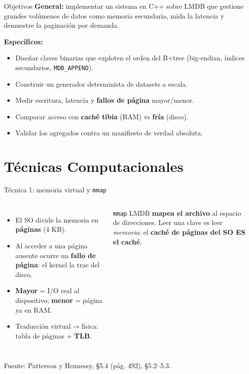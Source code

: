 \documentclass[aspectratio=169,11pt]{beamer}
\begin{document}
\begin{frame}{Objetivos}
  \textbf{General:} implementar un sistema en C++ sobre LMDB que gestione
  grandes volúmenes de datos como memoria secundaria, mida la latencia y
  demuestre la paginación por demanda.

  \vspace{0.3cm}
  \textbf{Específicos:}
  \begin{itemize}
    \item Diseñar claves binarias que exploten el orden del B+tree
      (big-endian, índices secundarios, \texttt{MDB\_APPEND}).
    \item Construir un generador determinista de datasets a escala.
    \item Medir escritura, latencia y \textbf{fallos de página} mayor/menor.
    \item Comparar acceso con \textbf{caché tibia} (RAM) vs \textbf{fría}
      (disco).
    \item Validar los agregados contra un manifiesto de verdad absoluta.
  \end{itemize}
\end{frame}

\section{Técnicas Computacionales}

\begin{frame}{Técnica 1: memoria virtual y \texttt{mmap}}
  \begin{columns}
      \begin{itemize}
        \item El SO divide la memoria en \textbf{páginas} (4 KB).
        \item Al acceder a una página ausente ocurre un \textbf{fallo de
          página}: el kernel la trae del disco.
        \item \textbf{Mayor} = I/O real al dispositivo; \textbf{menor} =
          página ya en RAM.
        \item Traducción virtual$\to$física: tabla de páginas + \textbf{TLB}.
      \end{itemize}
      \begin{block}{\texttt{mmap}}
        LMDB \textbf{mapea el archivo} al espacio de direcciones. Leer una
        clave es leer \emph{memoria}: el \textbf{caché de páginas del SO
        ES el caché}.
      \end{block}
  \end{columns}
  \vspace{0.2cm}
  \footnotesize Fuente: Patterson y Hennessy, \S5.4 (pág. 492), \S5.2--5.3.
\end{frame}
\end{document}
